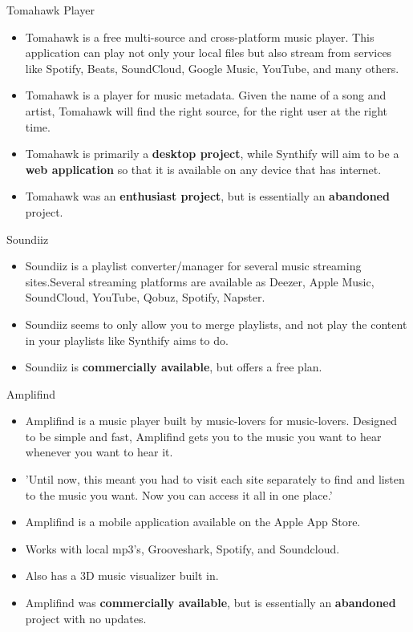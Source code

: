 Tomahawk Player \cite{tomahawk}
\begin{itemize}
  \item Tomahawk is a free multi-source and cross-platform music player. This application can play not only your local files but also stream from services like Spotify, Beats, SoundCloud, Google Music, YouTube, and many others.
  \item Tomahawk is a player for music metadata. Given the name of a song and artist, Tomahawk will find the right source, for the right user at the right time.
  \item Tomahawk is primarily a \textbf{desktop project}, while Synthify will aim to be a \textbf{web application} so that it is available on any device that has internet.
  \item Tomahawk was an \textbf{enthusiast project}, but is essentially an \textbf{abandoned} project.
\end{itemize}

Soundiiz \cite{soundiiz}
\begin{itemize}
  \item Soundiiz is a playlist converter/manager for several music streaming sites.Several streaming platforms are available as Deezer, Apple Music, SoundCloud, YouTube, Qobuz, Spotify, Napster.
  \item Soundiiz seems to only allow you to merge playlists, and not play the content in your playlists like Synthify aims to do.
  \item Soundiiz is \textbf{commercially available}, but offers a free plan.
\end{itemize}

Amplifind \cite{amplifind}
\begin{itemize}
  \item Amplifind is a music player built by music-lovers for music-lovers. Designed to be simple and fast, Amplifind gets you to the music you want to hear whenever you want to hear it.
  \item 'Until now, this meant you had to visit each site separately to find and listen to the music you want. Now you can access it all in one place.'
  \item Amplifind is a mobile application available on the Apple App Store.
  \item Works with local mp3’s, Grooveshark, Spotify, and Soundcloud.
  \item Also has a 3D music visualizer built in.
  \item Amplifind was \textbf{commercially available}, but is essentially an \textbf{abandoned} project with no updates.
\end{itemize}
